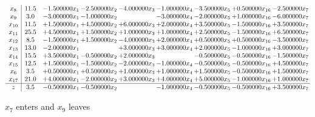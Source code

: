 \documentclass[10pt]{article}
\begin{document}
 \[\begin{array}{c| c c@{\hskip 2pt} c@{\hskip 2pt} c@{\hskip 2pt} c@{\hskip 2pt} c@{\hskip 2pt} c@{\hskip 2pt} c@{\hskip 2pt} }
 x_{8}   &  11.5 & -1.500000 x_{1} & -2.500000 x_{2} & -4.000000 x_{3} & -1.000000 x_{4} & -3.500000 x_{5} & + 0.500000 x_{16} & -2.500000 x_{7}\\
 x_{9}   &  3.0 & -3.000000 x_{1} & -1.000000 x_{2} &   & -3.000000 x_{4} & -2.000000 x_{5} & + 1.000000 x_{16} & -6.000000 x_{7}\\
 x_{10}   &  11.5 & + 1.500000 x_{1} & + 4.500000 x_{2} & + 6.000000 x_{3} & + 2.000000 x_{4} & + 3.500000 x_{5} & -1.500000 x_{16} & + 3.500000 x_{7}\\
 x_{11}   &  25.5 & + 4.500000 x_{1} & + 1.500000 x_{2} & + 1.000000 x_{3} & + 1.000000 x_{4} & + 2.500000 x_{5} & -1.500000 x_{16} & + 6.500000 x_{7}\\
 x_{12}   &  8.5 & -1.500000 x_{1} & + 1.500000 x_{2} & -4.000000 x_{3} & + 2.000000 x_{4} & + 0.500000 x_{5} & + 0.500000 x_{16} & -3.500000 x_{7}\\
 x_{13}   &  13.0 & -2.000000 x_{1} &   & + 3.000000 x_{3} & + 3.000000 x_{4} & + 2.000000 x_{5} & -1.000000 x_{16} & + 3.000000 x_{7}\\
 x_{14}   &  15.5 & + 3.500000 x_{1} & -0.500000 x_{2} & + 2.000000 x_{3} &   & -0.500000 x_{5} & -0.500000 x_{16} & -1.500000 x_{7}\\
 x_{15}   &  12.5 & + 1.500000 x_{1} & -1.500000 x_{2} & -2.000000 x_{3} & -1.000000 x_{4} & -0.500000 x_{5} & -0.500000 x_{16} & + 4.500000 x_{7}\\
 x_{6}   &  3.5 & + 0.500000 x_{1} & + 0.500000 x_{2} & + 1.000000 x_{3} & + 1.000000 x_{4} & + 1.500000 x_{5} & -0.500000 x_{16} & + 1.500000 x_{7}\\
 x_{17}   &  21.0 & + 4.000000 x_{1} & -2.000000 x_{2} & + 3.000000 x_{3} & + 4.000000 x_{4} & + 5.000000 x_{5} & -1.000000 x_{16} & + 1.000000 x_{7}\\
\hline
z    &  3.5 & -0.500000 x_{1} & -0.500000 x_{2} &   & -1.000000 x_{4} & -0.500000 x_{5} & -0.500000 x_{16} & + 3.500000 x_{7}\\
\end{array}\]


 $ x_{7} $ enters and $ x_{9} $ leaves 
\end{document}

